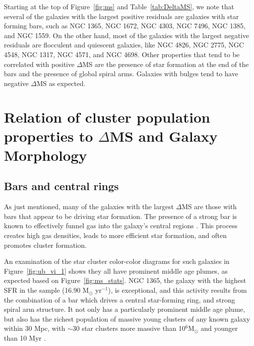\documentclass[linenumbers]{aastex63}
\begin{document}
Starting at the top of Figure~\ref{fig:ms} and Table~\ref{tab:DeltaMS}, we note that several of the galaxies with the largest positive residuals are galaxies with star forming bars, such as NGC 1365, NGC 1672, NGC 4303, NGC 7496, NGC 1385, and NGC 1559. On the other hand, most of the galaxies with the largest negative residuals are flocculent and quiescent galaxies, like NGC 4826, NGC 2775, NGC 4548, NGC 1317, NGC 4571, and NGC 4698.    
Other properties that tend to be correlated with positive $\Delta$MS are the presence of star formation at the end of the bars and the presence of global spiral arms. Galaxies with bulges tend to have negative $\Delta$MS as expected.

\section{Relation of cluster population properties to $\Delta$MS and Galaxy Morphology} \label{sect:deltams}

\subsection{Bars and central rings}

 As just mentioned, many of the galaxies with the largest $\Delta$MS are those with bars that appear to be driving star formation.  
 The presence of a strong bar is known to effectively funnel gas into the galaxy's central regions \citep[e.g.][]{athanassoula_existence_1992,sellwood_dynamics_1993,kuno_nobeyama_2007, sormani_fuelling_2023, schinnerer_phangs-jwst_2023}.  This process creates high gas densities, leads to more efficient star formation, and often promotes cluster formation. 

An examination of the star cluster color-color diagrams for such galaxies in Figure~\ref{fig:ub_vi_1} shows they all have prominent middle age plumes, as expected based on Figure~\ref{fig:ms_stats}. NGC 1365, the galaxy with the highest SFR in the sample (16.90 M$_{\odot}$ yr$^{-1}$), is exceptional, and this activity results from the combination of a bar which drives a central star-forming ring, and strong spiral arm structure.
 It not only has a particularly prominent middle age plume, but also has the richest population of massive young clusters of any known galaxy within 30 Mpc, with $\sim$30 star clusters more massive than 10$^6$M$_{\odot}$ and younger than 10 Myr \citep{whitmore_phangs-jwst_2023}.
 
\end{document}
